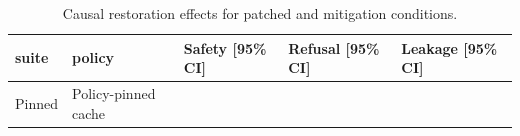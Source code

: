 \begin{table}[t]
\centering
\begingroup
\footnotesize
\setlength{\tabcolsep}{2pt}
\renewcommand{\arraystretch}{0.94}
\begin{tabularx}{\linewidth}{@{}llXXX@{}}
\toprule
suite & policy & Safety [95\% CI] & Refusal [95\% CI] & Leakage [95\% CI] \\
\midrule
Pinned & Policy-pinned cache &  &  &  \\
\bottomrule
\end{tabularx}
\endgroup
\caption{Causal restoration effects for patched and mitigation conditions.}
\label{tab:causal-restoration}
\end{table}
